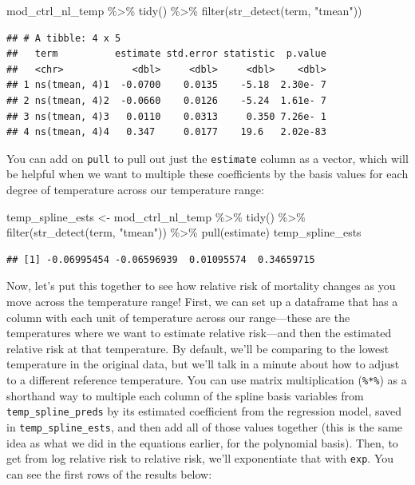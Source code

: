 \documentclass[
]{book}
\newenvironment{Shaded}{\begin{snugshade}}{\end{snugshade}}
\newcommand{\FunctionTok}[1]{\textcolor[rgb]{0.00,0.00,0.00}{#1}}
\newcommand{\NormalTok}[1]{#1}
\newcommand{\OtherTok}[1]{\textcolor[rgb]{0.56,0.35,0.01}{#1}}
\newcommand{\SpecialCharTok}[1]{\textcolor[rgb]{0.00,0.00,0.00}{#1}}
\newcommand{\StringTok}[1]{\textcolor[rgb]{0.31,0.60,0.02}{#1}}
\begin{document}
\begin{Shaded}
\begin{Highlighting}[]
\NormalTok{mod\_ctrl\_nl\_temp }\SpecialCharTok{\%\textgreater{}\%} 
  \FunctionTok{tidy}\NormalTok{() }\SpecialCharTok{\%\textgreater{}\%} 
  \FunctionTok{filter}\NormalTok{(}\FunctionTok{str\_detect}\NormalTok{(term, }\StringTok{"tmean"}\NormalTok{))}
\end{Highlighting}
\end{Shaded}

\begin{verbatim}
## # A tibble: 4 x 5
##   term          estimate std.error statistic  p.value
##   <chr>            <dbl>     <dbl>     <dbl>    <dbl>
## 1 ns(tmean, 4)1  -0.0700    0.0135    -5.18  2.30e- 7
## 2 ns(tmean, 4)2  -0.0660    0.0126    -5.24  1.61e- 7
## 3 ns(tmean, 4)3   0.0110    0.0313     0.350 7.26e- 1
## 4 ns(tmean, 4)4   0.347     0.0177    19.6   2.02e-83
\end{verbatim}

You can add on \texttt{pull} to pull out just the \texttt{estimate} column as a vector, which will be
helpful when we want to multiple these coefficients by the basis values for each degree
of temperature across our temperature range:

\begin{Shaded}
\begin{Highlighting}[]
\NormalTok{temp\_spline\_ests }\OtherTok{\textless{}{-}}\NormalTok{ mod\_ctrl\_nl\_temp }\SpecialCharTok{\%\textgreater{}\%} 
  \FunctionTok{tidy}\NormalTok{() }\SpecialCharTok{\%\textgreater{}\%} 
  \FunctionTok{filter}\NormalTok{(}\FunctionTok{str\_detect}\NormalTok{(term, }\StringTok{"tmean"}\NormalTok{)) }\SpecialCharTok{\%\textgreater{}\%} 
  \FunctionTok{pull}\NormalTok{(estimate)}
\NormalTok{temp\_spline\_ests}
\end{Highlighting}
\end{Shaded}

\begin{verbatim}
## [1] -0.06995454 -0.06596939  0.01095574  0.34659715
\end{verbatim}

Now, let's put this together to see how relative risk of mortality changes as you move
across the temperature range! First, we can set up a dataframe that has a column with
each unit of temperature across our range---these are the temperatures where we want to
estimate relative risk---and then the estimated relative risk at that temperature. By
default, we'll be comparing to the lowest temperature in the original data, but we'll talk
in a minute about how to adjust to a different reference temperature. You can use
matrix multiplication (\texttt{\%*\%}) as a shorthand way to multiple each column of the spline
basis variables from \texttt{temp\_spline\_preds} by its estimated coefficient from the regression
model, saved in \texttt{temp\_spline\_ests}, and then add all of those values together (this is
the same idea as what we did in the equations earlier, for the polynomial basis). Then,
to get from log relative risk to relative risk, we'll exponentiate that with \texttt{exp}. You
can see the first rows of the results below:
\end{document}
